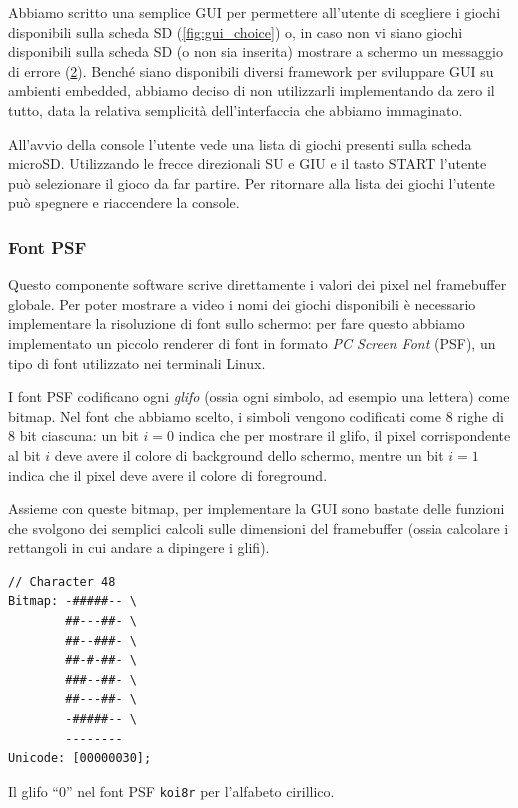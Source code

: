 \documentclass[hidelinks,12pt]{article}
\begin{document}
\begin{figure}[h]
\begin{center}
\begin{subfigure}[b]{0.4\textwidth}
\begin{center}
			\end{center}
			\caption{}
			\label{fig:gui_err}
		\end{subfigure}
	\end{center}
	\caption{}
\end{figure}
Abbiamo scritto una semplice GUI per permettere all'utente di scegliere i giochi
disponibili sulla scheda SD (\cref{fig:gui_choice}) o, in caso non vi siano
giochi disponibili sulla scheda SD (o non sia inserita) mostrare a schermo un
messaggio di errore (\cref{fig:gui_err}).
Benché siano disponibili diversi framework per sviluppare GUI su ambienti
embedded, abbiamo deciso di non utilizzarli implementando da zero il tutto, data
la relativa semplicità dell'interfaccia che abbiamo immaginato.

All'avvio della console l'utente vede una lista di giochi presenti sulla scheda
microSD. Utilizzando le frecce direzionali SU e GIU e il tasto START l'utente
può selezionare il gioco da far partire. Per ritornare alla lista dei giochi
l'utente può spegnere e riaccendere la console.

\subsubsection{Font PSF}
Questo componente software scrive direttamente i valori dei pixel nel
framebuffer globale. Per poter mostrare a video i nomi dei giochi disponibili è
necessario implementare la risoluzione di font sullo schermo: per fare questo
abbiamo implementato un piccolo renderer di font in formato
\textit{PC Screen Font} (PSF), un tipo di font utilizzato nei terminali Linux.

I font PSF codificano ogni \textit{glifo} (ossia ogni simbolo, ad esempio una
lettera) come bitmap. Nel font che abbiamo scelto, i simboli vengono codificati
come $8$ righe di $8$ bit ciascuna:
un bit $i = 0$ indica che per mostrare il glifo, il pixel corrispondente al
bit $i$ deve avere il colore di background dello schermo, mentre un bit $i = 1$
indica che il pixel deve avere il colore di foreground.

Assieme con queste bitmap, per implementare la GUI sono bastate delle funzioni
che svolgono dei semplici calcoli sulle dimensioni del framebuffer (ossia
calcolare i rettangoli in cui andare a dipingere i glifi).
\begin{table}[h]
	\begin{verbatim}
// Character 48
Bitmap: -#####-- \
        ##---##- \
        ##--###- \
        ##-#-##- \
        ###--##- \
        ##---##- \
        -#####-- \
        --------
Unicode: [00000030];
	\end{verbatim}
	\caption{Il glifo ``0'' nel font PSF \texttt{koi8r} per l'alfabeto cirillico.}
\end{table}
\end{document}
